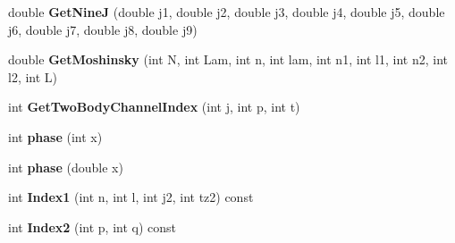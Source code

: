 \begin{DoxyCompactItemize}
\item 
\hypertarget{classModelSpace_ab9303a5a0cc4513bf4ed4430d9fe86a6}{double {\bfseries Get\-Nine\-J} (double j1, double j2, double j3, double j4, double j5, double j6, double j7, double j8, double j9)}\label{classModelSpace_ab9303a5a0cc4513bf4ed4430d9fe86a6}

\item 
\hypertarget{classModelSpace_a85f0b95b2cd46504702ea80489455beb}{double {\bfseries Get\-Moshinsky} (int N, int Lam, int n, int lam, int n1, int l1, int n2, int l2, int L)}\label{classModelSpace_a85f0b95b2cd46504702ea80489455beb}

\item 
\hypertarget{classModelSpace_ae73e211248e6f2bd4cc1bb0f030144ce}{int {\bfseries Get\-Two\-Body\-Channel\-Index} (int j, int p, int t)}\label{classModelSpace_ae73e211248e6f2bd4cc1bb0f030144ce}

\item 
\hypertarget{classModelSpace_a6b4d1686088e3fef492df10bbd806fe2}{int {\bfseries phase} (int x)}\label{classModelSpace_a6b4d1686088e3fef492df10bbd806fe2}

\item 
\hypertarget{classModelSpace_a07d1c8f00131cc6c192d440e6be329f3}{int {\bfseries phase} (double x)}\label{classModelSpace_a07d1c8f00131cc6c192d440e6be329f3}

\item 
\hypertarget{classModelSpace_ab9e4a36b032abc3fcd81da8b2a8707d2}{int {\bfseries Index1} (int n, int l, int j2, int tz2) const }\label{classModelSpace_ab9e4a36b032abc3fcd81da8b2a8707d2}

\item 
\hypertarget{classModelSpace_acb31fdcb54a8fe3168378969176f0157}{int {\bfseries Index2} (int p, int q) const }\label{classModelSpace_acb31fdcb54a8fe3168378969176f0157}

\end{DoxyCompactItemize}

